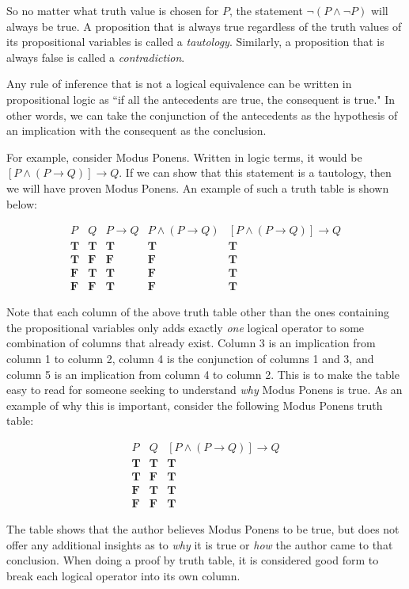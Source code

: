 \documentclass[11pt,oneside]{book}
\theoremstyle{definition}
\newcommand{\T}{\mathbf{T}}
\newcommand{\F}{\mathbf{F}}
\begin{document}
So no matter what truth value is chosen for $P$, the statement $\lnot(P \land \lnot P)$ will always be true.
A proposition that is always true regardless of the truth values of its propositional variables is called a \emph{tautology}.
Similarly, a proposition that is always false is called a \emph{contradiction}.

Any rule of inference that is not a logical equivalence can be written in propositional logic as ``if all the antecedents are true, the consequent is true."
In other words, we can take the conjunction of the antecedents as the hypothesis of an implication with the consequent as the conclusion.

For example, consider Modus Ponens.
Written in logic terms, it would be $[P \land (P \rightarrow Q)] \rightarrow Q$.
If we can show that this statement is a tautology, then we will have proven Modus Ponens.
An example of such a truth table is shown below:

\[\begin{array}{c|c|c|c|c}
P & Q & P \rightarrow Q & P \land (P \rightarrow Q) & [P \land (P \rightarrow Q)] \rightarrow Q \\
\hline
\T & \T & \T & \T & \T \\
\T & \F & \F & \F & \T \\
\F & \T & \T & \F & \T \\
\F & \F & \T & \F & \T
\end{array}\]

Note that each column of the above truth table other than the ones containing the propositional variables only adds exactly \emph{one} logical operator to some combination of columns that already exist.
Column 3 is an implication from column 1 to column 2, column 4 is the conjunction of columns 1 and 3, and column 5 is an implication from column 4 to column 2.
This is to make the table easy to read for someone seeking to understand \emph{why} Modus Ponens is true.
As an example of why this is important, consider the following Modus Ponens truth table:

\[\begin{array}{c|c|c}
P & Q & [P \land (P \rightarrow Q)] \rightarrow Q \\
\hline
\T & \T & \T \\
\T & \F & \T \\
\F & \T & \T \\
\F & \F & \T
\end{array}\]

The table shows that the author believes Modus Ponens to be true, but does not offer any additional insights as to \emph{why} it is true or \emph{how} the author came to that conclusion.
When doing a proof by truth table, it is considered good form to break each logical operator into its own column.
\end{document}
